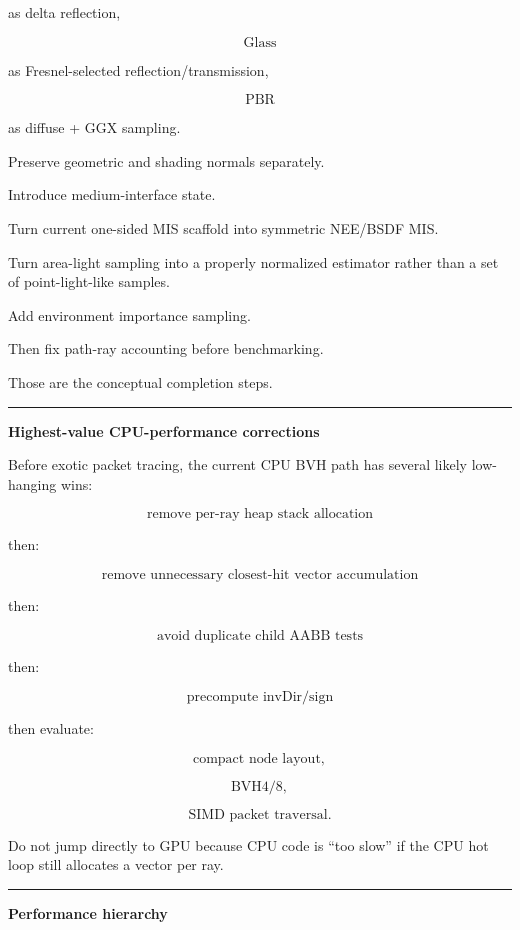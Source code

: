 as delta reflection,

\[
\text{Glass}
\]

as Fresnel-selected reflection/transmission,

\[
\text{PBR}
\]

as diffuse + GGX sampling.

Preserve geometric and shading normals separately.

Introduce medium-interface state.

Turn current one-sided MIS scaffold into symmetric NEE/BSDF MIS.

Turn area-light sampling into a properly normalized estimator rather than a set of point-light-like samples.

Add environment importance sampling.

Then fix path-ray accounting before benchmarking.

Those are the conceptual completion steps.

\begin{center}\rule{0.5\linewidth}{0.5pt}\end{center}

\textbf{Highest-value CPU-performance corrections}

Before exotic packet tracing, the current CPU BVH path has several likely low-hanging wins:

\[
\boxed{
\text{remove per-ray heap stack allocation}
}
\]

then:

\[
\boxed{
\text{remove unnecessary closest-hit vector accumulation}
}
\]

then:

\[
\boxed{
\text{avoid duplicate child AABB tests}
}
\]

then:

\[
\boxed{
\text{precompute invDir/sign}
}
\]

then evaluate:

\[
\text{compact node layout},
\]

\[
\text{BVH4/8},
\]

\[
\text{SIMD packet traversal}.
\]

Do not jump directly to GPU because CPU code is ``too slow'' if the CPU hot loop still allocates a vector per ray.

\begin{center}\rule{0.5\linewidth}{0.5pt}\end{center}

\textbf{Performance hierarchy}

